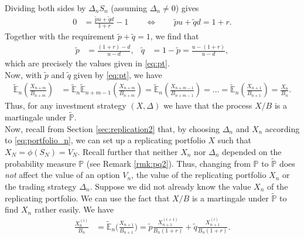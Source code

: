 \documentclass[12pt]{book}
\numberwithin{equation}{chapter}
\theoremstyle{plain}
\numberwithin{theorem}{section}
\theoremstyle{definition}
\numberwithin{exercise}{chapter}
\newcommand{\<}{\langle}
\renewcommand{\>}{\rangle}
\renewcommand{\(}{\left(}
\renewcommand{\)}{\right)}
\renewcommand{\[}{\left[}
\renewcommand{\]}{\right]}
\newcommand\Eb{\mathds{E}}
\newcommand\Pb{\mathds{P}}
\newcommand\Del{\Delta}
\newcommand\Ebt{\widetilde{\Eb}}
\newcommand\Pbt{\widetilde{\Pb}}
\newcommand\qt{\widetilde{q}}
\theoremstyle{definition}
\numberwithin{question}{section}
\newcommand\pt{\widetilde{p}}
\begin{document}
Dividing both sides by $\Del_n S_n$ (assuming $\Del_n \neq 0$) gives
\begin{align}
0
	&=	\frac{\pt u + \qt d}{1+r} - 1
	\qquad \Longleftrightarrow \qquad
\pt u + \qt d
	=	1+r .
\end{align}
Together with the requirement $\pt + \qt = 1$, we find that
\begin{align}
\pt
	&=	\frac{(1+r)-d}{u-d} , &
\qt
	&=	1 - \pt
	=	\frac{u - (1+r)}{u-d} ,
\end{align}
which are precisely the values given in \eqref{eq:pt}.
\\[0.5em]
Now, with $\pt$ and $\qt$ given by \eqref{eq:pt}, we have
\begin{align}
\Ebt_n \( \frac{X_{n+m}}{B_{n+m}} \)
	&=	\Ebt_n \Ebt_{n + m -1 } \( \frac{X_{n+m}}{B_{n+m}} \) 
	 =	\Ebt_n \( \frac{X_{n+m-1}}{B_{n+m-1}} \)  
	 =	\ldots
	 =	\Ebt_n \( \frac{X_{n+1}}{B_{n+1}} \) = \frac{X_n}{B_n} . \label{eq:is.martingale}
\end{align}
Thus, for any investment strategy $(X,\Del)$ we have that the process $X/B$ is a martingale under $\Pbt$.
\\[0.5em]
Now, recall from Section \ref{sec:replication2} that, by choosing $\Del_n$ and $X_n$ according to \eqref{eq:portfolio_n}, we can set up a replicating portfolio $X$ such that $X_N = \phi(S_N) = V_N$.  Recall further that neither $X_n$ nor $\Del_n$ depended on the probability measure $\Pb$ (see Remark \ref{rmk:pq2}).  Thus, changing from $\Pb$ to $\Pbt$ does \textit{not} affect the value of an option $V_n$, the value of the replicating portfolio $X_n$ or the trading strategy $\Del_n$.  Suppose we did not already know the value $X_n$ of the replicating portfolio.  We can use the fact that $X/B$ is a martingale under $\Pbt$ to find $X_n$ rather easily.  
We have
\begin{align}
\frac{X_n^{(i)}}{B_n}
	&=	\Ebt_n \Big( \frac{X_{n+1}}{B_{n+1}} \Big)
	 =	\pt \frac{X_{n+1}^{(i+1)}}{B_n (1+r)} + \qt \frac{X_{n+1}^{(i)}}{B_n (1+r)} .
\end{align}
\end{document}
